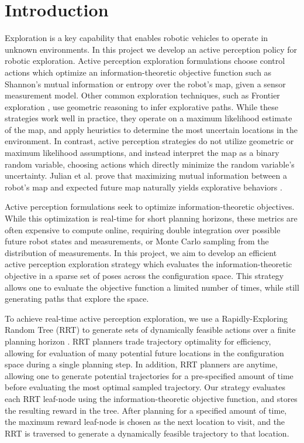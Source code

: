 \section{Introduction}
\label{section:introduction}

Exploration is a key capability that enables robotic vehicles to operate in
unknown environments. In this project we develop an active perception policy
for robotic exploration. Active perception exploration formulations
choose control actions which optimize an information-theoretic objective
function such as Shannon's mutual information or entropy \cite{} over the robot's map,
given a sensor measurement model. Other common exploration techniques, such as Frontier
exploration \cite{}, use geometric reasoning to infer explorative paths.
While these strategies work well in practice, they operate on a
maximum likelihood estimate of the map, and apply heuristics to determine the most uncertain
locations in the environment. In contrast, active perception strategies do not utilize
geometric or maximum likelihood assumptions, and instead interpret the map as a binary
random variable, choosing actions which directly minimize the random variable's uncertainty.
Julian et al. prove that maximizing mutual information between a
robot's map and expected future map naturally yields explorative behaviors
\cite{}.

Active perception formulations seek to optimize information-theoretic
objectives. While this optimization is real-time for short planning horizons,
these metrics are often expensive to compute online, requiring double
integration over possible future robot states and measurements, or Monte Carlo sampling
from the distribution of measurements. In this project, we aim to develop an
efficient active perception exploration strategy which evaluates the
information-theoretic objective in a sparse set of poses across the
configuration space. This strategy allows one to evaluate the objective function
a limited number of times, while still generating paths that explore the space.

To achieve real-time active perception exploration, we use a Rapidly-Exploring Random Tree
(RRT) to generate sets of dynamically feasible actions over a finite planning horizon
\cite{}. RRT planners trade trajectory optimality for efficiency, allowing for evaluation
of many potential future locations in the configuration space during a single planning
step. In addition, RRT planners are anytime, allowing one to generate potential trajectories
for a pre-specified amount of time before evaluating the most optimal sampled trajectory. Our
strategy evaluates each RRT leaf-node using the information-theoretic objective function,
and stores the resulting reward in the tree. After planning for a specified
amount of time, the maximum reward leaf-node is chosen as the next location to
visit, and the RRT is traversed to generate a dynamically feasible trajectory to
that location.

